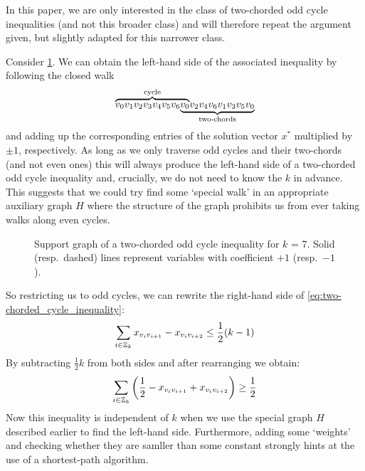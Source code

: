 In this paper, we are only interested in the class of two-chorded odd cycle inequalities (and not this broader class) and will therefore repeat the argument given, but slightly adapted for this narrower class.

Consider \cref{fig:support_graph_two-chorded_odd_cycle_inequality}.
We can obtain the left-hand side of the associated inequality by following the closed walk
\[
\mathrlap{\overbrace{\phantom{v_{0} v_{1} v_{2} v_{3} v_{4} v_{5} v_{6} v_{0}}}^{\text{cycle}}}
v_{0} v_{1} v_{2} v_{3} v_{4} v_{5} v_{6}
\mathrlap{\underbrace{\phantom{v_{0} v_{2} v_{4} v_{6} v_{1} v_{3} v_{5} v_{0}}}_{\text{two-chords}}}
v_{0} v_{2} v_{4} v_{6} v_{1} v_{3} v_{5} v_{0}
\]
and adding up the corresponding entries of the solution vector $x^{*}$ multiplied by $\pm 1$, respectively.
As long as we only traverse odd cycles and their two-chords (and not even ones) this will always produce the left-hand side of a two-chorded odd cycle inequality and, crucially, we do not need to know the $k$ in advance.
This suggests that we could try find some ‘special walk’ in an appropriate auxiliary graph $H$ where the structure of the graph prohibits us from ever taking walks along even cycles.

\begin{figure}
	\centering
	\caption[Support graph of a two-chorded odd cycle inequality]{Support graph of a two-chorded odd cycle inequality for $k$ = 7.
	Solid (resp.\ dashed) lines represent variables with coefficient $+1$ (resp.\ $-1$).}
	\label{fig:support_graph_two-chorded_odd_cycle_inequality}
\end{figure}

So restricting us to odd cycles, we can rewrite the right-hand side of \cref{eq:two-chorded_cycle_inequality}:
\begin{equation*}
	\sum_{i \in \mathbb{Z}_k} x_{v_i v_{i+1}} - x_{v_i v_{i+2}} \leq \frac{1}{2} (k-1)
\end{equation*}
By subtracting $\frac{1}{2}k$ from both sides and after rearranging we obtain:
\begin{equation}\label{eq:two-chorded_graph_weights}
	\sum_{i \in \mathbb{Z}_k} \left( \frac{1}{2} -x_{v_i v_{i+1}} + x_{v_i v_{i+2}} \right) \geq \frac{1}{2}
\end{equation}
Now this inequality is independent of $k$ when we use the special graph $H$ described earlier to find the left-hand side.
Furthermore, adding some ‘weights’ and checking whether they are samller than some constant strongly hints at the use of a shortest-path algorithm.


